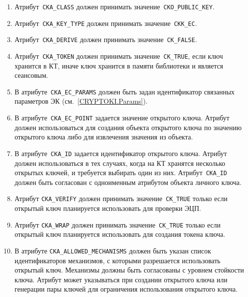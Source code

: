 \begin{enumerate}
\item
Атрибут~\verb|CKA_CLASS| должен принимать значение~\verb|CKO_PUBLIC_KEY|.

\item
Атрибут~\verb|CKA_KEY_TYPE| должен принимать значение~\verb|CKK_EC|.

\item
Атрибут~\verb|CKA_DERIVE| должен принимать значение~\verb|CK_FALSE|.

\item
Атрибут~\verb|CKA_TOKEN| должен принимать значение~\verb|CK_TRUE|,
если ключ хранится в КТ, иначе ключ хранится в памяти библиотеки и
является сеансовым.

\item
В атрибуте~\verb|CKA_EC_PARAMS| должен быть задан идентификатор связанных 
параметров ЭК (см.~\ref{CRYPTOKI.Params}).

\item
В атрибуте~\verb|CKA_EC_POINT| задается значение открытого ключа. 
Атрибут должен использоваться для создания объекта открытого ключа 
по значению открытого ключа либо для извлечения значения из объекта. 

\item
В атрибуте~\verb|CKA_ID| задается идентификатор открытого ключа. 
Атрибут должен использоваться в тех случаях, когда на КТ  
хранятся несколько открытых ключей, и требуется выбирать один из них. 
%
Атрибут~\verb|CKA_ID| должен быть согласован с одноименным атрибутом 
объекта личного ключа.

\item
Атрибут \verb|CKA_VERIFY| должен принимать значение~\verb|CK_TRUE| 
только если открытый ключ планируется использовать для проверки ЭЦП.

\item
Атрибут \verb|CKA_WRAP| должен принимать значение~\verb|CK_TRUE|
только если открытый ключ планируется использовать для создания
токена ключа.

\item
В атрибуте \verb|CKA_ALLOWED_MECHANISMS| должен быть указан список 
идентификаторов механизмов, с которыми разрешается использовать
открытый ключ. Механизмы должны быть согласованы с уровнем стойкости 
ключа. Атрибут может указываться при создании открытого
ключа или генерации пары ключей для ограничения использования
открытого ключа. 
\end{enumerate}
 
